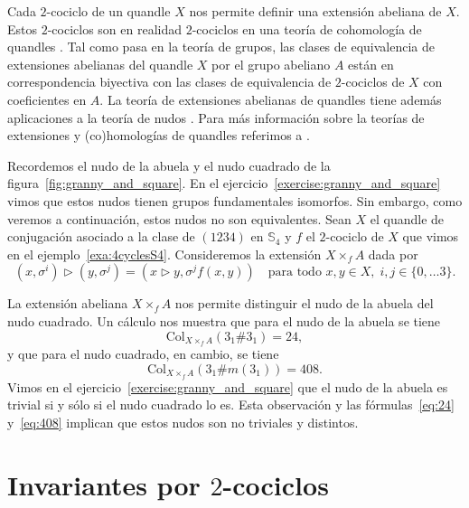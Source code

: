 \documentclass[graybox]{svmult}
\newcommand{\Sym}{\mathbb{S}}
\begin{document}
Cada $2$-cociclo de un quandle $X$
nos permite definir una extensión abeliana de $X$. Estos $2$-cociclos son
en realidad $2$-cociclos en una teoría de cohomología de quandles
\cite{MR1990571}. Tal como pasa en la teoría de grupos, las clases de
equivalencia de extensiones abelianas del quandle $X$ por el grupo abeliano
$A$ están en correspondencia biyectiva con las clases de equivalencia de
$2$-cociclos de $X$ con coeficientes en $A$. La teoría de extensiones
abelianas de quandles tiene además aplicaciones a la teoría de nudos
\cite{MR2008876}.  Para más información sobre la teorías de extensiones y
(co)homologías de quandles referimos a \cite{MR1994219}.

\begin{example}
    \label{exa:granny_vs_square:2}
	Recordemos el nudo de la abuela y el nudo cuadrado de la
	figura~\ref{fig:granny_and_square}. En el
	ejercicio~\ref{exercise:granny_and_square} vimos que estos nudos tienen grupos
	fundamentales isomorfos. Sin embargo, como veremos a continuación, estos
	nudos no son equivalentes.  Sean $X$ el quandle de conjugación asociado a
	la clase de $(1234)$ en $\Sym_4$ y $f$ el $2$-cociclo de $X$ que vimos en el
	ejemplo~\ref{exa:4cyclesS4}.  Consideremos la extensión $X\times_fA$ dada
	por
    \[
        (x,\sigma^i)\triangleright (y,\sigma^j)=(x\triangleright y,\sigma^jf(x,y))
        \quad\text{para todo $x,y\in X,\;i,j\in\{0,\dots3\}$.}
    \]

    La extensión abeliana
    $X\times_fA$ nos permite distinguir el nudo de la abuela del nudo cuadrado.  Un
    cálculo nos muestra que para el nudo de la abuela se tiene
	\begin{equation}
		\label{eq:24}
    	\mathrm{Col}_{X\times_fA}(3_1\#3_1)=24,
	\end{equation}
    y que para el nudo cuadrado, en cambio, se tiene 
	\begin{equation}
		\label{eq:408}
    	\mathrm{Col}_{X\times_fA}(3_1\#m(3_1))=408.
	\end{equation}
	Vimos en el ejercicio~\ref{exercise:granny_and_square} que el nudo de la abuela
	es trivial si y sólo si el nudo cuadrado lo es. Esta observación y las
	fórmulas~\eqref{eq:24} y~\eqref{eq:408} implican que estos nudos son no
	triviales y distintos.
\end{example}

\section{Invariantes por $2$-cociclos}
\label{section:cocycles}
\end{document}
